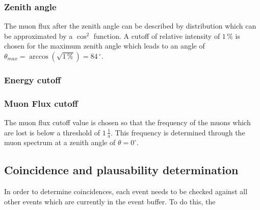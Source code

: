 \documentclass[abstract,toc,los,english,11pt,glossaries]{jluthesis}
\begin{document}
\subsubsection*{Zenith angle}
The muon flux after the zenith angle can be described by  distribution\cite{muonenergyspectrum} which can be approximated by a $\cos^2$ function. A cutoff of relative intensity of $1\,\%$ is chosen for the maximum zenith angle which leads to an angle of $\theta_{max} = \arccos\left(\sqrt{1\,\%}\right) = 84\,^\circ$.
\subsubsection*{Energy cutoff}
\subsubsection*{Muon Flux cutoff}
The muon flux cutoff value is chosen so that the frequency of the muons which are lost is below a threshold of $1\,\frac{1}{\text{a}}$. This frequency is determined through the muon spectrum\cite{muonenergyspectrum} at a zenith angle of $\theta = 0^{\circ}$. 
\subsection{Coincidence and plausability determination}
In order to determine coincidences, each event needs to be checked against all other events which are currently in the event buffer. To do this, the 
\end{document}

